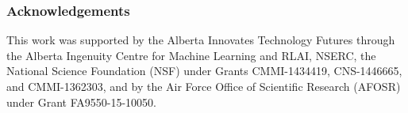 \documentclass[twoside,11pt]{article}
\begin{document}
\subsubsection*{Acknowledgements}
This work was supported by the Alberta Innovates Technology Futures through the Alberta Ingenuity Centre for Machine Learning and RLAI, NSERC, the National Science Foundation (NSF) under Grants CMMI-1434419, CNS-1446665, and CMMI-1362303, and by the Air Force Office of Scientific Research (AFOSR) under Grant FA9550-15-10050.





\clearpage\newpage
\onecolumn
\appendix
%
\end{document}
